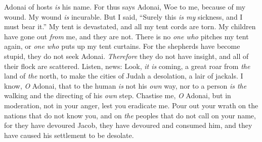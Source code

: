 \begin{biblechapter}
Adonai of hosts \textit{is} his name.
\verse For thus says Adonai,
 Woe to me, because of my wound. 
My wound \textit{is} incurable. 
But I said, “Surely this \textit{is my} sickness, 
and I must bear it.”
\verse My tent is devastated, 
and all my tent cords are torn. 
My children have gone out \textit{from} me, 
and they are not. 
There is no \textit{one who} pitches my tent again, 
or \textit{one who} puts up my tent curtains.
\verse For the shepherds have become stupid, 
they do not seek Adonai. 
\textit{Therefore} they do not have insight, 
and all of their flock are scattered.
\verse Listen, news: 
Look, \textit{it is} coming, 
a great roar from \textit{the} land of \textit{the} north, 
to make the cities of Judah a desolation, 
a lair of jackals.
\verse I know, \textit{O} Adonai, that to the human \textit{is} not his \textit{own} way, 
nor to a person \textit{is the} walking and the directing of his \textit{own} step.
\verse Chastise me, \textit{O} Adonai, but in moderation, 
not in your anger, lest you eradicate me.
\verse Pour out your wrath on the nations that do not know you, 
and on \textit{the} peoples that do not call on your name, 
for they have devoured Jacob, 
they have devoured and consumed him, 
and they have caused his settlement to be desolate.
\end{biblechapter}

